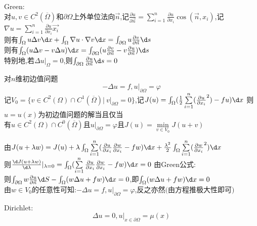 \begin{dingli*}
Green:\\
对$u,v\in C^2(\overline{\Omega})$和$\partial\Omega$上外单位法向$\vec{n}$,记$\frac{\partial u}{\partial \vec{n}}=\sum\limits_{i=1}^{n}\frac{\partial u}{\partial x_i}\cos(\vec{n},x_i)$,记$\nabla u=\sum\limits_{i=1}^{n}\frac{\partial u}{\partial x_i}\vec{x_i}$\\
则有$\int_{\Omega}u\Delta v\d x+\int_{\Omega}\nabla u\cdot \nabla v\d x=\int_{\partial \Omega}u\frac{\partial v}{\partial \vec{n}}\d s$\\
则有$\int_{\Omega}(u\Delta v-v\Delta u)\d x=\int_{\partial \Omega}(u\frac{\partial v}{\partial \vec{n}}-v\frac{\partial u}{\partial \vec{n}})\d s$\\
特别地,若$\Delta u|_{\Omega}=0$,则$\int_{\partial \Omega}\frac{\partial u}{\partial \vec{n}}\d s=0$
\end{dingli*}

\begin{dingli*}
对$n$维初边值问题
\[-\Delta u=f,u|_{\partial \Omega}=\varphi\]
记$V_{0}=\{v\in C^{2}(\Omega)\cap C^{1}(\overline{\Omega})|\ v|_{\partial \Omega}=0\}$,记$J(u)=\int_{\Omega}(\frac{1}{2}\sum\limits_{i=1}^{n}(\frac{\partial u}{\partial x_i}^2)-fu)\d x$
则$u=u(x)$为初边值问题的解当且仅当\\
有$u\in C^2(\Omega)\cap C^{0}(\overline{\Omega})$且$u|_{\partial \Omega}=\varphi$且$J(u)=\min\limits_{v\in V_0}J(u+v)$
\end{dingli*}

\begin{jie}
由$J(u+\lambda w)=J(u)+\lambda\int_{\Omega}\sum\limits_{i=1}^{n}(\frac{\partial u}{\partial x_i}\frac{\partial w}{\partial x_i}-fw)\d x+\frac{\lambda^2}{2}\int_{\Omega}\sum\limits_{i=1}^{n}(\frac{\partial w}{\partial x_i}^2)\d x$\\
则$\frac{\d J(u+\lambda w)}{\d \lambda}|_{\lambda=0}=\int_{\Omega}(\sum\limits_{i=1}^{n}\frac{\partial u}{\partial x_i}\frac{\partial w}{\partial x_i}-fw)\d x=0$
由Green公式:\\
则$\int_{\partial \Omega}w\frac{\partial u}{\partial \vec{n}}\d S-\int_{\Omega}(w\Delta u+fw)\d x=0$,即$\int_{\Omega}(w\Delta u+fw)\d x=0$\\
由$w\in V_0$的任意性可知:$-\Delta u=f,u|_{\partial \Omega}=\varphi$,反之亦然$($由方程推极大性即可$)$
\end{jie}

Dirichlet:
\[\Delta u=0,u|_{x\in\partial\Omega}=\mu(x)\]

